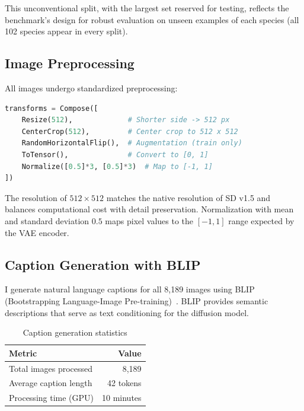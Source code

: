 \documentclass[11pt]{article}
\begin{document}
This unconventional split, with the largest set reserved for testing, reflects the benchmark's design for robust evaluation on unseen examples of each species (all 102 species appear in every split).

\subsection{Image Preprocessing}

All images undergo standardized preprocessing:

\begin{lstlisting}[language=Python, caption=Image preprocessing pipeline]
transforms = Compose([
    Resize(512),             # Shorter side -> 512 px
    CenterCrop(512),         # Center crop to 512 x 512
    RandomHorizontalFlip(),  # Augmentation (train only)
    ToTensor(),              # Convert to [0, 1]
    Normalize([0.5]*3, [0.5]*3)  # Map to [-1, 1]
])
\end{lstlisting}

The resolution of $512 \times 512$ matches the native resolution of SD v1.5 and balances computational cost with detail preservation. Normalization with mean and standard deviation $0.5$ maps pixel values to the $[-1,1]$ range expected by the VAE encoder.

\subsection{Caption Generation with BLIP}

I generate natural language captions for all 8,189 images using BLIP (Bootstrapping Language-Image Pre-training)~\cite{li2022blip}. BLIP provides semantic descriptions that serve as text conditioning for the diffusion model.

\begin{table}[!htbp]
\centering
\caption{Caption generation statistics}
\begin{tabular}{lr}
\toprule
Metric & Value \\
\midrule
Total images processed & 8,189 \\
Average caption length & 42 tokens \\ %
Processing time (GPU) & 10 minutes \\
\bottomrule
\end{tabular}
\end{table}
\end{document}
